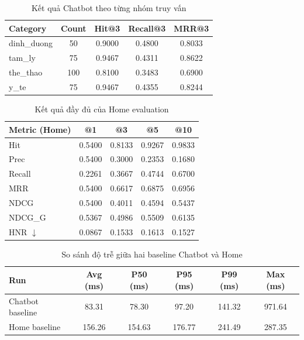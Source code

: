 \begin{table}[H]
\centering
\begin{tabular}{|l|c|c|c|c|}
\hline
\textbf{Category} & \textbf{Count} & \textbf{Hit@3} & \textbf{Recall@3} & \textbf{MRR@3} \\
\hline
dinh\_duong & 50 & 0.9000 & 0.4800 & 0.8033 \\
\hline
tam\_ly & 75 & 0.9467 & 0.4311 & 0.8622 \\
\hline
the\_thao & 100 & 0.8100 & 0.3483 & 0.6900 \\
\hline
y\_te & 75 & 0.9467 & 0.4355 & 0.8244 \\
\hline
\end{tabular}
\caption{Kết quả Chatbot theo từng nhóm truy vấn}
\label{tab:chatbot_category_metrics}
\end{table}

\begin{table}[H]
\centering
\begin{tabular}{|l|c|c|c|c|}
\hline
\textbf{Metric (Home)} & \textbf{@1} & \textbf{@3} & \textbf{@5} & \textbf{@10} \\
\hline
Hit & 0.5400 & 0.8133 & 0.9267 & 0.9833 \\
\hline
Prec & 0.5400 & 0.3000 & 0.2353 & 0.1680 \\
\hline
Recall & 0.2261 & 0.3667 & 0.4744 & 0.6700 \\
\hline
MRR & 0.5400 & 0.6617 & 0.6875 & 0.6956 \\
\hline
NDCG & 0.5400 & 0.4011 & 0.4594 & 0.5437 \\
\hline
NDCG\_G & 0.5367 & 0.4986 & 0.5509 & 0.6135 \\
\hline
HNR $\downarrow$ & 0.0867 & 0.1533 & 0.1613 & 0.1527 \\
\hline
\end{tabular}
\caption{Kết quả đầy đủ của Home evaluation}
\label{tab:home_full_metrics}
\end{table}

\begin{table}[H]
\centering
\begin{tabular}{|l|c|c|c|c|c|}
\hline
\textbf{Run} & \textbf{Avg (ms)} & \textbf{P50 (ms)} & \textbf{P95 (ms)} & \textbf{P99 (ms)} & \textbf{Max (ms)} \\
\hline
Chatbot baseline & 83.31 & 78.30 & 97.20 & 141.32 & 971.64 \\
\hline
Home baseline & 156.26 & 154.63 & 176.77 & 241.49 & 287.35 \\
\hline
\end{tabular}
\caption{So sánh độ trễ giữa hai baseline Chatbot và Home}
\label{tab:rec_latency_compare}
\end{table}




